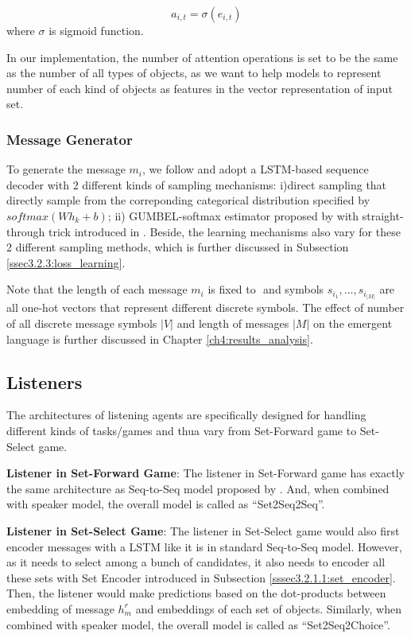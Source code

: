 \begin{equation}
  a_{i,t} = \sigma(e_{i,t})
  \label{eq3.2.1.1:sigmoid_to_replace_softmax}
\end{equation}
where $\sigma$ is sigmoid function.

In our implementation, the number of attention operations is set to be the same as the number of all types of objects, as we want to help models to represent number of each kind of objects as features in the vector representation of input set.

\subsubsection{Message Generator}
\label{sssec3.2.1.2:msg_generator}

To generate the message $m_i$, we follow \cite{havrylov2017emergence} and adopt a LSTM-based sequence decoder with 2 different kinds of sampling mechanisms: i)direct sampling that directly sample from the correponding categorical distribution specified by $softmax(Wh_k + b)$; ii) GUMBEL-softmax estimator proposed by \cite{jang2016categorical} with straight-through trick introduced in \cite{bengio2013estimating}. Beside, the learning mechanisms also vary for these 2 different sampling methods, which is further discussed in Subsection \ref{ssec3.2.3:loss_learning}.

Note that the length of each message $m_i$ is fixed to $ $ and symbols $s_{i_1},\dots,s_{i_|M|}$ are all one-hot vectors that represent different discrete symbols. The effect of number of all discrete message symbols $|V|$ and length of messages $|M|$ on the emergent language is further discussed in Chapter \ref{ch4:results_analysis}.

\subsection{Listeners}
\label{ssec3.2.2:listeners}

The architectures of listening agents are specifically designed for handling different kinds of tasks/games and thua vary from Set-Forward game to Set-Select game.

\noindent\textbf{Listener in Set-Forward Game}: The listener in Set-Forward game has exactly the same architecture as Seq-to-Seq model proposed by \cite{sutskever2014sequence}. And, when combined with speaker model, the overall model is called as ``Set2Seq2Seq''.

\noindent\textbf{Listener in Set-Select Game}: The listener in Set-Select game would also first encoder messages with a LSTM like it is in standard Seq-to-Seq model. However, as it needs to select among a bunch of candidates, it also needs to encoder all these sets with Set Encoder introduced in Subsection \ref{sssec3.2.1.1:set_encoder}. Then, the listener would make predictions based on the dot-products between embedding of message $h^r_m$ and embeddings of each set of objects. Similarly, when combined with speaker model, the overall model is called as ``Set2Seq2Choice''.

